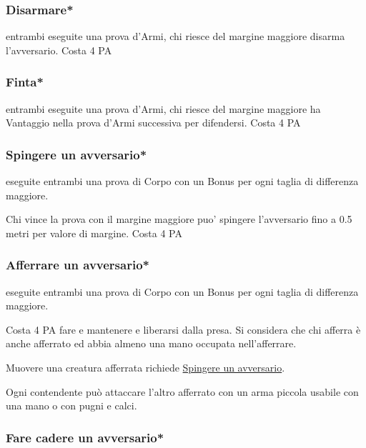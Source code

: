 \documentclass[12pt,a4paper,twoside,openany]{book}
\begin{document}
\begin{multicols}{2}
\subsubsection{Disarmare*}\label{disarmare}

entrambi eseguite una prova d'Armi, chi riesce del margine maggiore disarma l'avversario. Costa 4 PA

\subsubsection{Finta*} \label{finta}

entrambi eseguite una prova d'Armi, chi riesce del margine maggiore ha Vantaggio nella prova d'Armi successiva per difendersi. Costa 4 PA


\subsubsection{Spingere un avversario*} \label{spingereavversario}\hypertarget{spingereavversario}{}

eseguite entrambi una prova di Corpo con un Bonus per ogni taglia di differenza maggiore.

Chi vince la prova con il margine maggiore puo' spingere l'avversario fino a 0.5 metri per valore di margine. Costa 4 PA

\subsubsection{Afferrare un avversario*}\label{afferrareunavversario}

eseguite entrambi una prova di Corpo con un Bonus per ogni taglia di differenza maggiore.

Costa 4 PA fare e mantenere e liberarsi dalla presa. Si considera che chi afferra è anche afferrato ed abbia almeno una mano occupata nell'afferrare.

Muovere una creatura afferrata richiede \hyperlink{spingereavversario}{Spingere un avversario}.

Ogni contendente può attaccare l'altro afferrato con un arma piccola usabile con una mano o con pugni e calci.

\subsubsection{Fare cadere un avversario*} \label{farecadereavversario}


\end{multicols}
\end{document}
